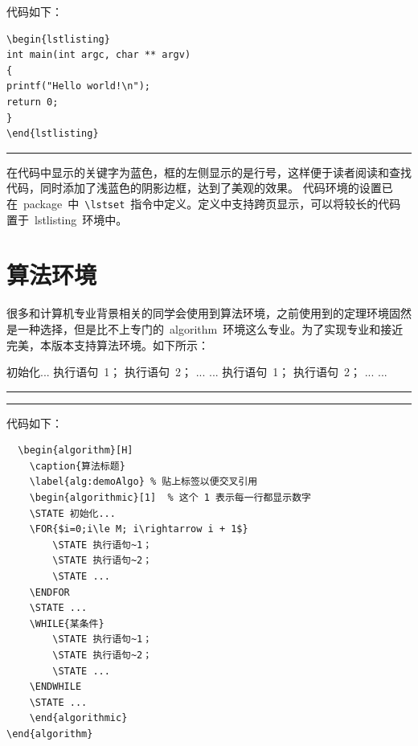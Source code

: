 \noindent 代码如下：
\begin{verbatim}
\begin{lstlisting}
int main(int argc, char ** argv)
{
printf("Hello world!\n");
return 0;
}
\end{lstlisting}
\end{verbatim}
\noindent\hrule\vspace{1em}

在代码中显示的关键字为蓝色，框的左侧显示的是行号，这样便于读者阅读和查找代码，同时添加了浅蓝色的阴影边框，达到了美观的效果。
代码环境的设置已在~package~中~\verb|\lstset|~指令中定义。定义中支持跨页显示，可以将较长的代码置于~lstlisting~环境中。
\section{算法环境}
很多和计算机专业背景相关的同学会使用到算法环境，之前使用到的定理环境固然是一种选择，但是比不上专门的~algorithm~环境这么专业。为了实现专业和接近完美，本版本支持算法环境。如下所示：
\begin{algorithm}[H]
    \caption{算法标题}
    \label{alg:demoAlgo} %
    \begin{algorithmic}[1]  %
    \STATE 初始化...
        \STATE 执行语句~1；
        \STATE 执行语句~2；
        \STATE ...
    \ENDFOR
    \STATE ...
        \STATE 执行语句~1；
        \STATE 执行语句~2；
        \STATE ...
    \ENDWHILE
    \STATE ...
    \end{algorithmic}
\end{algorithm}
\noindent\hrule
\vspace{0.1em}\noindent\hrule

\vspace{1em}

\noindent 代码如下：
\begin{verbatim}
  \begin{algorithm}[H]
    \caption{算法标题}
    \label{alg:demoAlgo} % 贴上标签以便交叉引用
    \begin{algorithmic}[1]  % 这个 1 表示每一行都显示数字
    \STATE 初始化...
    \FOR{$i=0;i\le M; i\rightarrow i + 1$}
        \STATE 执行语句~1；
        \STATE 执行语句~2；
        \STATE ...
    \ENDFOR
    \STATE ...
    \WHILE{某条件}
        \STATE 执行语句~1；
        \STATE 执行语句~2；
        \STATE ...
    \ENDWHILE
    \STATE ...
    \end{algorithmic}
\end{algorithm}
\end{verbatim}

